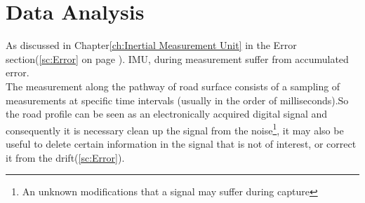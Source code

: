 \documentclass[tesi]{subfiles}
\begin{document}
\chapter{Data Analysis}
\label{ch:Data Analysis}
As discussed in Chapter\ref{ch:Inertial Measurement Unit} in the Error section(\ref{sc:Error} on page \pageref{sc:Error}). IMU, during measurement suffer from accumulated error.\\
The measurement along the pathway of road surface consists of a sampling of measurements at specific time intervals (usually in the order of milliseconds).So the road profile can be seen as an electronically acquired digital signal and consequently it is necessary clean up the signal from the noise\footnote{An unknown modifications that a signal may suffer during capture}, it may also be useful to delete certain information in the signal that is not of interest, or correct it from the drift(\ref{sc:Error}).\\
\end{document}
